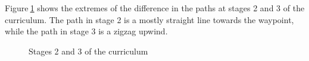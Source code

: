 Figure$~$\ref{curriculum} shows the extremes of the difference in the paths at stages 2 and 3 of the curriculum. The path in stage 2 is a mostly straight line towards the waypoint, while the path in stage 3 is a zigzag upwind. 

\begin{figure}
    \centering
    \caption{Stages 2 and 3 of the curriculum}\label{curriculum}
\end{figure}

